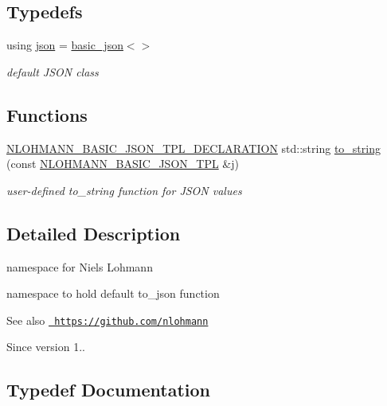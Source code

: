 \subsection*{Typedefs}
\begin{DoxyCompactItemize}
\item 
using \mbox{\hyperlink{namespacenlohmann_a2bfd99e845a2e5cd90aeaf1b1431f474}{json}} = \mbox{\hyperlink{classnlohmann_1_1basic__json}{basic\+\_\+json}}$<$$>$
\begin{DoxyCompactList}\small\item\em default J\+S\+ON class \end{DoxyCompactList}\end{DoxyCompactItemize}
\subsection*{Functions}
\begin{DoxyCompactItemize}
\item 
\mbox{\hyperlink{json_8hpp_a0643bd74c2dc6f0e4e420b8190ea8f0f}{N\+L\+O\+H\+M\+A\+N\+N\+\_\+\+B\+A\+S\+I\+C\+\_\+\+J\+S\+O\+N\+\_\+\+T\+P\+L\+\_\+\+D\+E\+C\+L\+A\+R\+A\+T\+I\+ON}} std\+::string \mbox{\hyperlink{namespacenlohmann_a6ce645a0b8717757e096a5b5773b7a16}{to\+\_\+string}} (const \mbox{\hyperlink{json_8hpp_a80b7254e63f199a1f656f07ae551f632}{N\+L\+O\+H\+M\+A\+N\+N\+\_\+\+B\+A\+S\+I\+C\+\_\+\+J\+S\+O\+N\+\_\+\+T\+PL}} \&j)
\begin{DoxyCompactList}\small\item\em user-\/defined to\+\_\+string function for J\+S\+ON values \end{DoxyCompactList}\end{DoxyCompactItemize}


\subsection{Detailed Description}
namespace for Niels Lohmann 

namespace to hold default {\ttfamily to\+\_\+json} function

\begin{DoxySeeAlso}{See also}
\href{https://github.com/nlohmann}{\texttt{ https\+://github.\+com/nlohmann}} 
\end{DoxySeeAlso}
\begin{DoxySince}{Since}
version 1.. 
\end{DoxySince}


\subsection{Typedef Documentation}
\mbox{\label{namespacenlohmann_a2bfd99e845a2e5cd90aeaf1b1431f474}} 
